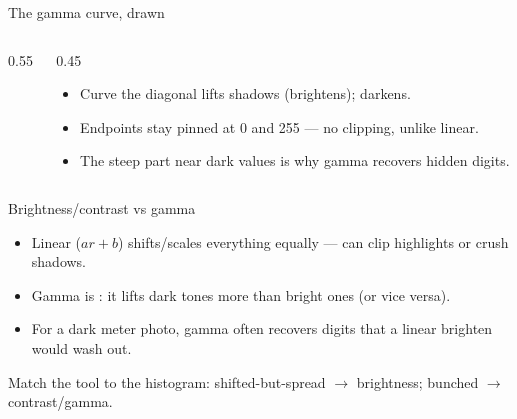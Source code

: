 \documentclass[10pt,aspectratio=169]{beamer}
\begin{document}
\begin{frame}{The gamma curve, drawn}
  \begin{columns}[T]
    \begin{column}{0.55\textwidth}
    \begin{center}
    \end{center}
    \end{column}
    \begin{column}{0.45\textwidth}
      \begin{itemize}
        \item Curve  the diagonal lifts shadows (brightens);  darkens.
        \item Endpoints stay pinned at 0 and 255 — no clipping, unlike linear.
        \item The steep part near dark values is why gamma recovers hidden digits.
      \end{itemize}
    \end{column}
  \end{columns}
\end{frame}

\begin{frame}{Brightness/contrast vs gamma}
  \begin{itemize}
    \item Linear ($a r + b$) shifts/scales everything equally — can clip highlights or crush shadows.
    \item Gamma is : it lifts dark tones more than bright ones (or vice versa).
    \item For a dark meter photo, gamma often recovers digits that a linear brighten would wash out.
  \end{itemize}
  \begin{goodbox}
    Match the tool to the histogram: shifted-but-spread $\rightarrow$ brightness; bunched $\rightarrow$ contrast/gamma.
  \end{goodbox}
\end{frame}
\end{document}
